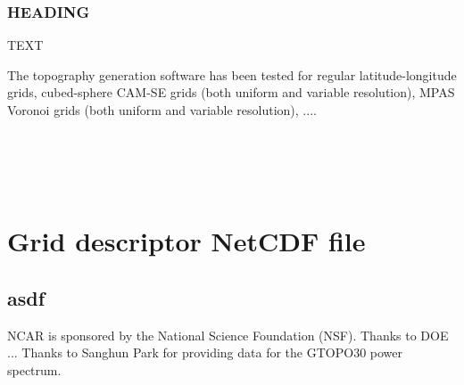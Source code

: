 \documentclass[gmd]{copernicus}
\begin{document}
\subsubsection{HEADING}
TEXT




\conclusions  %
The topography generation software has been tested for regular latitude-longitude grids, cubed-sphere CAM-SE grids (both uniform and variable resolution), MPAS Voronoi grids (both uniform and variable resolution), ....




\appendix
\section{\\ \\ \hspace*{-7mm} Grid descriptor NetCDF file}    %

\subsection{asdf}                               %




\begin{acknowledgements}
NCAR is sponsored by the National Science Foundation (NSF). Thanks to DOE ... Thanks to Sanghun Park for providing data for the GTOPO30 power spectrum.
\end{acknowledgements}






%
%
%
%


\end{document}
